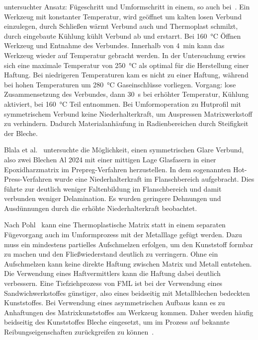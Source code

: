 untersuchter Ansatz: Fügeschritt und Umformschritt in einem, so auch bei~\cite{BerndArno2017}.
Ein Werkzeug mit konstanter Temperatur, wird geöffnet um kalten losen Verbund einzulegen, durch Schließen wärmt Verbund auch und Thermoplast schmilzt, durch eingebaute Kühlung kühlt Verbund ab und erstarrt.
Bei \SI{160}{\degreeCelsius} Öffnen Werkzeug und Entnahme des Verbundes.
Innerhalb von \SI{4}{\minute} kann das Werkzeug wieder auf Temperatur gebracht werden.
In der Untersuchung erwies sich eine maximale Temperatur von \SI{250}{\degreeCelsius} als optimal für die Herstellung einer Haftung.
Bei niedrigeren Temperaturen kam es nicht zu einer Haftung, während bei hohen Temperaturen um \SI{280}{\degreeCelsius} Gaseinschlüsse vorliegen.
Vorgang: lose Zusammensetzung des Verbundes, dann \SI{30}{\second} bei erhöhter Temperatur, Kühlung aktiviert, bei \SI{160}{\degreeCelsius} Teil entnommen.
Bei Umformoperation zu Hutprofil mit symmetrischem Verbund keine Niederhalterkraft, um Auspressen Matrixwerkstoff zu verhindern.
Dadurch Materialanhäufung in Radienbereichen durch Steifigkeit der Bleche.

Blala et al.~\cite{Blala2021} untersuchte die Möglichkeit, einen symmetrischen Glare Verbund, also zwei Blechen Al 2024 mit einer mittigen Lage Glasfasern in einer Epoxidharzmatrix im Prepreg-Verfahren herzustellen.
In dem sogenannten Hot-Press-Verfahren wurde eine Niederhalterkraft im Flanschbereich aufgebracht.
Dies führte zur deutlich weniger Faltenbildung im Flanschbereich und damit verbunden weniger Delamination.
Es wurden geringere Dehnungen und Ausdünnungen durch die erhöhte Niederhalterkraft beobachtet.

Nach Pohl~\cite{Pohl2000} kann eine Thermoplastische Matrix statt in einem separaten Fügevorgang auch im Umformprozess mit der Metalllage gefügt werden.
Dazu muss ein mindestens partielles Aufschmelzen erfolgen, um den Kunststoff formbar zu machen und den Fließwiederstand deutlich zu verringern.
Ohne ein Aufschmelzen kann keine direkte Haftung zwischen Matrix und Metall entstehen.
Die Verwendung eines Haftvermittlers kann die Haftung dabei deutlich verbessern.
Eine Tiefziehprozess von FML ist bei der Verwendung eines Sandwichwerkstoffes günstiger, also eines beidseitig mit Metallblechen bedeckten Kunststoffes.
Bei Verwendung eines asymmetrischen Aufbaus kann es zu Anhaftungen des Matrixkunststoffes am Werkzeug kommen.
Daher werden häufig beidseitig des Kunststoffes Bleche eingesetzt, um im Prozess auf bekannte Reibungseigenschaften zurückgreifen zu können~\cite{Behrens2014}.



